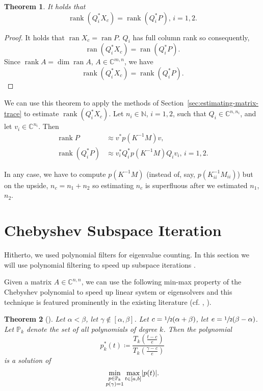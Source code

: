 \documentclass[%
	paper=a4,
	fontsize=10pt,
	DIV11,BCOR10mm,
	numbers=noenddot,
	abstract=yes
]{scrartcl}
\newcommand{\F}{\mathbb{C}}
\DeclarePairedDelimiter\abs{\lvert}{\rvert}
\DeclareMathOperator{\ran}{ran}
\DeclareMathOperator{\rank}{rank}
\newtheorem{theorem}{Theorem}[section]
\theoremstyle{definition}
\begin{document}
\begin{theorem}
	It holds that
	\[ \rank(Q_i^* X_c) = \rank(Q_i^* P), \, i = 1, 2. \]
\end{theorem}

\begin{proof}
	It holds that $\ran X_c = \ran P$. $Q_i$ has full column rank so
	consequently,
	\[ \ran(Q_i^* X_c) = \ran(Q_i^* P). \]
	Since $\rank A = \dim \ran A$, $A \in \F^{m,n}$, we have
	\[ \rank(Q_i^* X_c) = \rank(Q_i^* P). \]
\end{proof}

We can use this theorem to apply the methods of
Section~\ref{sec:estimating-matrix-trace} to estimate $\rank(Q_i^* X_c)$. Let
$n_i \in \mathbb{N}$, $i = 1, 2$, such that $Q_i \in \F^{n,n_i}$, and let $v_i
\in \F^{n_i}$. Then
\begin{align*}
	\rank P &\approx v^* p(K^{-1} M) v, \\
	\rank(Q_i^* P) &\approx v_i^* Q_i^* p(K^{-1} M) Q_i v_i, \, i = 1, 2.
\end{align*}

In any case, we have to compute $p(K^{-1} M)$ (instead of, say, $p(K_{ii}^{-1}
M_{ii})$) but on the upside, $n_c = n_1 + n_2$ so estimating $n_c$ is
superfluous after we estimated $n_1$, $n_2$.



\section{Chebyshev Subspace Iteration}

Hitherto, we used polynomial filters for eigenvalue counting. In this section we
will use polynomial filtering to speed up subspace iterations
\cite[§5]{Saad2011}.

Given a matrix $A \in \F^{n,n}$, we can use the following min-max property of
the Chebyshev polynomial to speed up linear system or eigensolvers and this
technique is featured prominently in the existing literature (cf.
\cite[§7]{Saad2011}, \cite[§11.2.8]{Golub2012}).

\begin{theorem}[{\cite[Theorem~4.8]{Saad2011}}]
	Let $\alpha < \beta$, let $\gamma \not\in [\alpha, \beta]$. Let $c =
	\sfrac{1}{2} (\alpha + \beta)$, let $e = \sfrac{1}{2}(\beta - \alpha)$. Let
	$\mathbb{P}_k$ denote the set of all polynomials of degree $k$. Then the
	polynomial
	\[
		p_k^*(t) \coloneqq \frac%
			{T_k \left(\frac{t-c}{e}\right)}
			{T_k \left(\frac{\gamma-c}{e}\right)}
	\]
	is a solution of
	\[
		\min_{\substack{p \in \mathbb{P}_k \\ p(\gamma) = 1}}
		\max_{t \in [a,b]} \abs{p(t)}.
	\]
\end{theorem}
\end{document}
